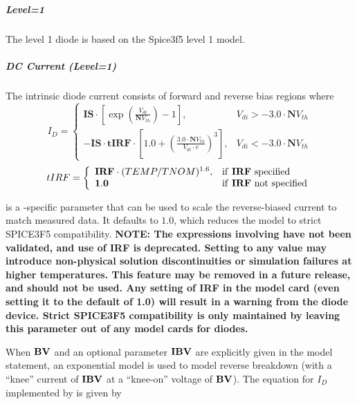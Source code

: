 \subparagraph{Level=1}
The level 1 diode is based on the Spice3f5 level 1 model.

\subparagraph{DC Current (Level=1)}

The intrinsic diode current consists of forward and reverse bias regions where
$$
I_D = \left\{ \begin{array}{ll}
\mathbf{IS}\cdot\left[\exp \left(\frac{V_{di}}{\mathbf{N}V_{th}}\right) - 1
\right], & V_{di} > -3.0\cdot\mathbf{N}V_{th} \\
-\mathbf{IS}\cdot\mathbf{tIRF}\cdot\left[1.0 + \left(\frac{3.0\cdot\mathbf{N}V_{th}}{V_{di}\cdot
e}\right)^3\right], & V_{di} < -3.0\cdot\mathbf{N}V_{th}
\end{array}
\right.
$$
$$
tIRF = \left\{ \begin{array}{ll}
\mathbf{IRF}\cdot(TEMP/TNOM)^{1.6}, & \mbox{if \textbf{IRF} specified} \\
\mathbf{1.0} & \mbox{if \textbf{IRF} not specified}
\end{array}
\right.
$$

 is a \Xyce{}-specific parameter that can be used to
scale the reverse-biased current to match measured data.  It defaults
to $1.0$, which reduces the model to strict SPICE3F5 compatibility.
\textbf{NOTE: The expressions involving  have not been validated,
  and use of IRF is deprecated.  Setting  to any value may
  introduce non-physical solution discontinuities or simulation
  failures at higher temperatures.  This feature may be removed in a
  future release, and should not be used.  Any setting of IRF in the
  model card (even setting it to the default of 1.0) will result in a
  warning from the diode device.  Strict SPICE3F5 compatibility is only
  maintained by leaving this parameter out of any model cards for diodes.}

When $\mathbf{BV}$ and an optional parameter $\mathbf{IBV}$ are explicitly given in the model
statement, an exponential model is used to model reverse breakdown (with a
``knee'' current of $\mathbf{IBV}$ at a ``knee-on'' voltage of $\mathbf{BV}$).  The equation
for $I_D$ implemented by \Xyce{} is given by

